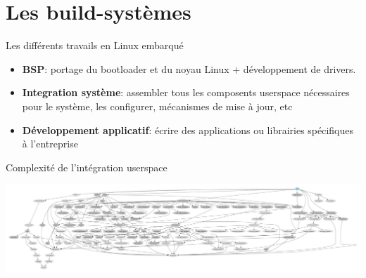 \section{Les build-systèmes}

\begin{frame}{Les différents travails en Linux embarqué}
  \begin{itemize}
  \item {\bf BSP}: portage du bootloader et du noyau Linux + développement de drivers.
  \item {\bf Integration système}: assembler tous les composents userspace nécessaires pour le système, les configurer, mécanismes de mise à jour, etc
  \item {\bf Développement applicatif}: écrire des applications ou librairies spécifiques à l'entreprise
  \end{itemize}
\end{frame}

\begin{frame}{Complexité de l'intégration userspace}
  \begin{center}
    \includegraphics[width=\textwidth]{graphics/graph-depends.pdf}
  \end{center}
\end{frame}

